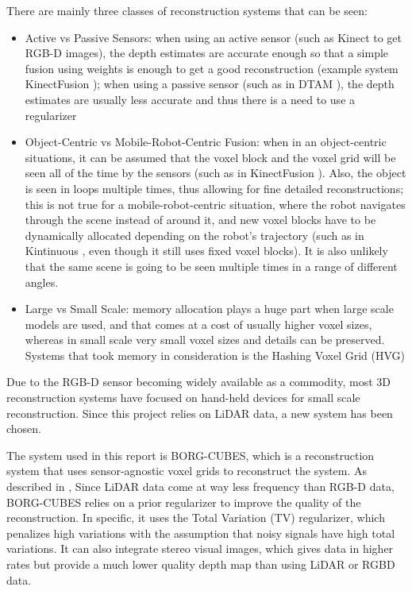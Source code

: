 \documentclass[12pt]{article}
\begin{document}
There are mainly three classes of reconstruction systems that can be seen:
	
\begin{itemize}
\item Active vs Passive Sensors: when using an active sensor (such as Kinect to get RGB-D images), the depth estimates are accurate enough so that a simple fusion using weights is enough to get a good reconstruction (example system KinectFusion \cite{kinectfusion}); when using a passive sensor (such as in DTAM \cite{DTAM}), the depth estimates are usually less accurate and thus there is a need to use a regularizer
\item Object-Centric vs Mobile-Robot-Centric Fusion: when in an object-centric situations, it can be assumed that the voxel block and the voxel grid will be seen all of the time by the sensors (such as in KinectFusion \cite{kinectfusion}). Also, the object is seen in loops multiple times, thus allowing for fine detailed reconstructions; this is not true for a mobile-robot-centric situation, where the robot navigates through the scene instead of around it, and new voxel blocks have to be dynamically allocated depending on the robot's trajectory (such as in Kintinuous \cite{kintinuous}, even though it still uses fixed voxel blocks). It is also unlikely that the same scene is going to be seen multiple times in a range of different angles.
\item Large vs Small Scale: memory allocation plays a huge part when large scale models are used, and that comes at a cost of usually higher voxel sizes, whereas in small scale very small voxel sizes and details can be preserved. Systems that took memory in consideration is the Hashing Voxel Grid (HVG) \cite{HVG}
\end{itemize}
	
Due to the RGB-D sensor becoming widely available as a commodity, most 3D reconstruction systems have focused on hand-held devices for small scale reconstruction. Since this project relies on LiDAR data, a new system has been chosen.	
	
The system used in this report is BORG-CUBES, which is a reconstruction system that uses sensor-agnostic voxel grids to reconstruct the system. As described in \cite{TannerArXiv2016}, Since LiDAR data come at way less frequency than RGB-D data, BORG-CUBES relies on a prior regularizer to improve the quality of the reconstruction. In specific, it uses the Total Variation (TV) regularizer, which penalizes high variations with the assumption that noisy signals have high total variations. It can also integrate stereo visual images, which gives data in higher rates but provide a much lower quality depth map than using LiDAR or RGBD data.	
\end{document}
